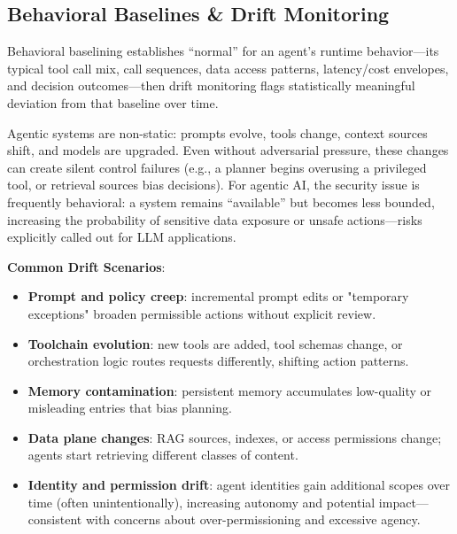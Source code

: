 

\begin{TNtwocol}

    \section{Behavioral Baselines & Drift Monitoring }

    Behavioral baselining establishes “normal” for an agent's runtime behavior—its typical tool call mix, call sequences, data access patterns, latency/cost envelopes, and decision outcomes—then drift monitoring flags statistically meaningful deviation from that baseline over time.

    Agentic systems are non-static: prompts evolve, tools change, context sources shift, and models are upgraded. Even without adversarial pressure, these changes can create silent control failures (e.g., a planner begins overusing a privileged tool, or retrieval sources bias decisions). For agentic AI, the security issue is frequently behavioral: a system remains “available” but becomes less bounded, increasing the probability of sensitive data exposure or unsafe actions—risks explicitly called out for LLM applications.

    \textbf{Common Drift Scenarios}:
    \begin{itemize}
        \item \textbf{Prompt and policy creep}: incremental prompt edits or "temporary exceptions" broaden permissible actions without explicit review.
        \item \textbf{Toolchain evolution}: new tools are added, tool schemas change, or orchestration logic routes requests differently, shifting action patterns.
        \item \textbf{Memory contamination}: persistent memory accumulates low-quality or misleading entries that bias planning.
        \item \textbf{Data plane changes}: RAG sources, indexes, or access permissions change; agents start retrieving different classes of content.
        \item \textbf{Identity and permission drift}: agent identities gain additional scopes over time (often unintentionally), increasing autonomy and potential impact—consistent with concerns about over-permissioning and excessive agency.
    \end{itemize}


\end{TNtwocol}

